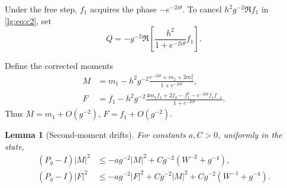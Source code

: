 \documentclass[11pt]{article}
\numberwithin{equation}{section}
\newtheorem{lemma}[theorem]{Lemma}
\theoremstyle{remark}
\begin{document}
Under the free step, $f_1$ acquires the phase $-e^{-2i\theta}$.
To cancel $h^2g^{-2}\Re f_1$ in \eqref{lg:eq:c2}, set
\[
 Q=-g^{-2}\Re\left[\frac{h^2}{1+e^{-2i\theta}}f_1\right].
\]

Define the corrected moments
\begin{align}
 M&=m_1-h^2g^{-2}\frac{e^{-2i\theta}+m_2+2m_1^2}{1+e^{-2i\theta}},
 \label{uvg:eq:M}\\
 F&=f_1-h^2g^{-2}\frac{4m_1f_1+2f_2-f_1^2-e^{-2i\theta}f_1f_{-1}}
 {1+e^{-2i\theta}}.\label{uvg:eq:F}
\end{align}
Thus \(M=m_1+O(g^{-2})\), \(F=f_1+O(g^{-2})\).

\begin{lemma}[Second-moment drifts]\label{uvg:lem:drifts}
For constants \(a,C>0\), uniformly in the state,
\begin{align}
 (P_g-I)|M|^2&\le-ag^{-2}|M|^2+Cg^{-2}(W^{-2}+g^{-4}),\label{uvg:eq:Mdrift}\\
 (P_g-I)|F|^2&\le-ag^{-2}|F|^2+Cg^{-2}|M|^2
                         +Cg^{-2}(W^{-1}+g^{-4}).\label{uvg:eq:Fdrift}
\end{align}
\end{lemma}
\end{document}

